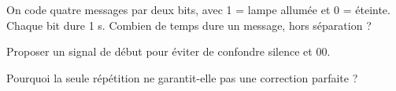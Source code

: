\label{defi-ex-18}
\begin{questions}
\item On code quatre messages par deux bits, avec 1 = lampe allumée et 0 = éteinte. Chaque bit dure 1 s. Combien de temps dure un message, hors séparation ?
\item Proposer un signal de début pour éviter de confondre silence et 00.
\item Pourquoi la seule répétition ne garantit-elle pas une correction parfaite ?
\end{questions}
\pcGrille

